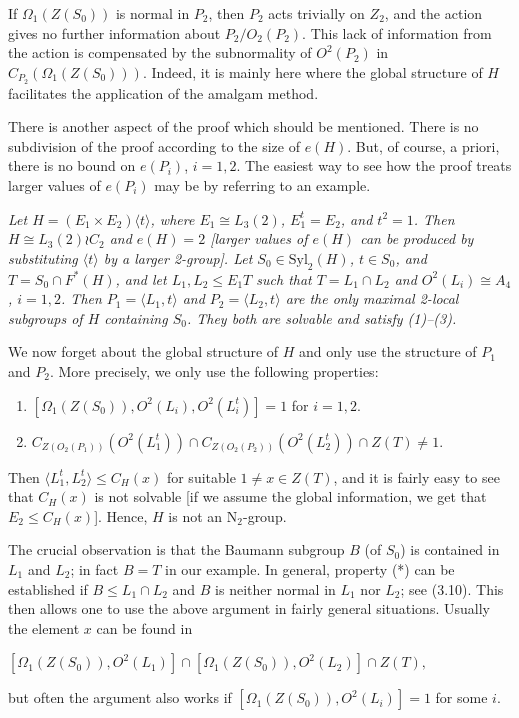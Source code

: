 \documentclass[11pt]{article}
\theoremstyle{plain}
\theoremstyle{stmplain}
\newcommand{\N}{\mathrm{N}}
\newcommand{\disp}[1]{\begin{center}$\displaystyle #1$\end{center}}
\begin{document}
\noindent If $\Omega_1(Z(S_0))$ is normal in $P_2$, then $P_2$ acts trivially on
$Z_2$, and the action gives no further information about $P_2/O_2(P_2)$. This
lack of information from the action is compensated by the subnormality of
$O^2(P_2)$ in $C_{P_2}(\Omega_1(Z(S_0)))$. Indeed, it is mainly here where the
global structure of $H$ facilitates the application of the amalgam method.

\noindent There is another aspect of the proof which should be mentioned. There is
no subdivision of the proof according to the size of $e(H)$. But, of course, a
priori, there is no bound on $e(P_i)$, $i = 1, 2$. The easiest way to see how
the proof treats larger values of $e(P_i)$ may be by referring to an example.

\smallskip
\noindent\emph{Let $H = (E_1 \times E_2)\langle t \rangle$, where $E_1 \cong L_3(2)$,
$E_1^t = E_2$, and $t^2 = 1$. Then $H \cong L_3(2) \wr C_2$ and $e(H) = 2$ [larger
values of $e(H)$ can be produced by substituting $\langle t \rangle$ by a larger
2-group]. Let $S_0 \in \mathrm{Syl}_2(H)$, $t \in S_0$, and $T = S_0 \cap
F^*(H)$, and let $L_1, L_2 \le E_1T$ such that $T = L_1 \cap L_2$ and
$O^2(L_i) \cong A_4$, $i = 1, 2$. Then $P_1 = \langle L_1, t \rangle$ and
$P_2 = \langle L_2, t \rangle$ are the only maximal 2-local subgroups of $H$
containing $S_0$. They both are solvable and satisfy (1)--(3).}

\noindent We now forget about the global structure of $H$ and only use the
structure of $P_1$ and $P_2$. More precisely, we only use the following
properties:
\begin{enumerate}
\item[(*)] $[\Omega_1(Z(S_0)), O^2(L_i), O^2(L_i^t)] = 1$ for $i = 1, 2$.
\item[(**)] $C_{Z(O_2(P_1))}(O^2(L_1^t)) \cap C_{Z(O_2(P_2))}(O^2(L_2^t)) \cap Z(T) \ne 1$.
\end{enumerate}

\noindent Then $\langle L_1^t, L_2^t \rangle \le C_H(x)$ for suitable
$1 \ne x \in Z(T)$, and it is fairly easy to see that $C_H(x)$ is not solvable
[if we assume the global information, we get that $E_2 \le C_H(x)$]. Hence,
$H$ is not an $\N_2$-group.

\noindent The crucial observation is that the Baumann subgroup $B$ (of $S_0$) is
contained in $L_1$ and $L_2$; in fact $B = T$ in our example. In general,
property (*) can be established if $B \le L_1 \cap L_2$ and $B$ is neither
normal in $L_1$ nor $L_2$; see (3.10). This then allows one to use the above
argument in fairly general situations. Usually the element $x$ can be found in
\disp{[\Omega_1(Z(S_0)), O^2(L_1)] \cap [\Omega_1(Z(S_0)), O^2(L_2)] \cap Z(T),}
but often the argument also works if $[\Omega_1(Z(S_0)), O^2(L_i)] = 1$ for
some $i$.
\end{document}
